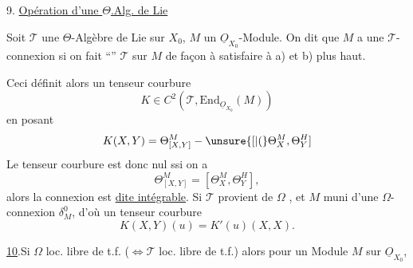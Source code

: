 9.\quad {} \uline{Opération d'une $\Theta$.Alg. de Lie}

Soit $\mathscr T$ une $\Theta$-Algèbre de Lie sur $X_0$, $M$ un $\underline O_{X_0}$-Module. On dit que  $M$ a une $\mathscr T$-connexion si on fait ``'' $\mathscr T$ sur $M$ de façon à satisfaire à a) et b) plus haut.

Ceci définit alors un tenseur courbure
\[
K\in C^2(\mathscr T,\mathrm{End}_{\underline O_{X_0}}(M))
\]
en posant
\[
K(X,Y)=\Theta_{[X,Y]}^M-\unsure{[|(}\Theta_X^M,\Theta_Y^H]
\]
Le tenseur courbure est donc nul ssi on a
\[
\Theta_{[X,Y]}^M=[\Theta_X^M,\Theta_Y^H],
\]
alors la connexion est \uline{dite intégrable}. Si $\mathscr T$ provient de $\Omega$ , et $M$  muni d'une $\Omega$-connexion $\delta_M^0$, d'où un tenseur courbure
\[
K(X,Y)(u)=K'(u)(X,X).
\]

\uline{10}.\quad Si  $\Omega$ loc. libre de t.f. ($\Longleftrightarrow\mathscr T$  loc. libre de t.f.) alors pour un Module $M$ sur $\underline O_{X_0}$,

